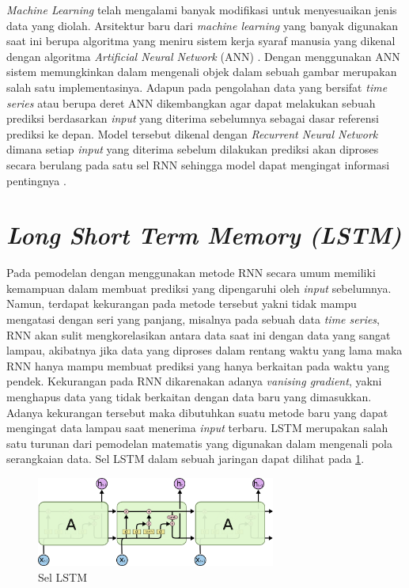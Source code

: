 \textit{Machine Learning} telah mengalami banyak modifikasi untuk menyesuaikan jenis data yang diolah.  Arsitektur baru dari \textit{machine learning} yang banyak digunakan saat ini berupa algoritma yang meniru sistem kerja syaraf manusia yang dikenal dengan algoritma \textit{Artificial Neural Network} (ANN) \cite{braspenning1995artificial}. Dengan menggunakan ANN sistem memungkinkan dalam mengenali objek dalam sebuah gambar merupakan salah satu implementasinya. Adapun pada pengolahan data yang bersifat \textit{time series} atau berupa deret ANN dikembangkan agar dapat melakukan sebuah prediksi berdasarkan \textit{input} yang diterima sebelumnya sebagai dasar referensi prediksi ke depan. Model tersebut dikenal dengan \textit{Recurrent Neural Network} dimana setiap \textit{input} yang diterima sebelum dilakukan prediksi akan diproses secara berulang pada satu sel RNN sehingga model dapat mengingat informasi pentingnya \cite{medsker2001recurrent}.


\section{\textit{Long Short Term Memory (LSTM)}}
Pada pemodelan dengan menggunakan metode RNN secara umum memiliki kemampuan dalam membuat prediksi yang dipengaruhi oleh \textit{input} sebelumnya. Namun, terdapat kekurangan pada metode tersebut yakni tidak mampu mengatasi dengan  seri yang panjang, misalnya pada sebuah data \textit{time series}, RNN akan sulit mengkorelasikan antara data saat ini dengan data yang sangat lampau, akibatnya jika data yang diproses dalam rentang waktu yang lama maka RNN hanya mampu membuat prediksi yang hanya berkaitan pada waktu yang pendek. Kekurangan pada RNN dikarenakan adanya \textit{vanising gradient}, yakni menghapus data yang tidak berkaitan dengan data baru yang dimasukkan. Adanya kekurangan tersebut maka dibutuhkan suatu metode baru yang dapat mengingat data lampau saat menerima \textit{input} terbaru. LSTM merupakan salah satu turunan dari pemodelan matematis yang digunakan dalam mengenali pola serangkaian data. Sel LSTM dalam sebuah jaringan dapat dilihat pada \ref{gambar:sel LSTM}.
\begin{figure}[h]
	\begin{center}
		\includegraphics[width=0.7\textwidth]{BAB-2/figures/LSTM3-chain.png}	
		\caption{Sel LSTM \cite{olah2015understanding}}
		\label{gambar:sel LSTM}
	\end{center}
\end{figure}

